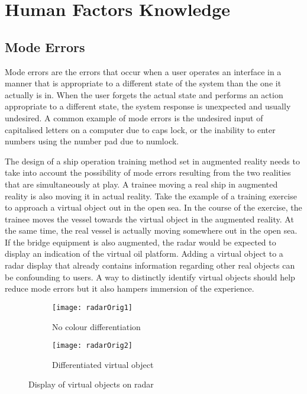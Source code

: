 \section{Human Factors Knowledge}
\label{sec:humanfactors}
\subsection{Mode Errors}
Mode errors are the errors that occur when a user operates an interface in a manner that is appropriate to a different state of the system than the one it actually is in. When the user forgets the actual state and performs an action appropriate to a different state, the system response is unexpected and usually undesired. A common example of mode errors is the undesired input of capitalised letters on a computer due to caps lock, or the inability to enter numbers using the number pad due to numlock. 

The design of a ship operation training method set in augmented reality needs to take into account the possibility of mode errors resulting from the two realities that are simultaneously at play. A trainee moving a real ship in augmented reality is also moving it in actual reality. Take the example of a training exercise to approach a virtual object out in the open sea. In the course of the exercise, the trainee moves the vessel towards the virtual object in the augmented reality. At the same time, the real vessel is actually moving somewhere out in the open sea. If the bridge equipment is also augmented, the radar would be expected to display an indication of the virtual oil platform. Adding a virtual object to a radar display that already contains information regarding other real objects can be confounding to users. A way to distinctly identify virtual objects should help reduce mode errors but it also hampers immersion of the experience. 

\begin{figure}[ht]
    \centering
    \begin{subfigure}[b]{0.45\textwidth}
        \centering
        \texttt{[image: radarOrig1]}
        \caption{No colour differentiation}
        \label{fig:three sin x}
    \end{subfigure}
    \hfill
    \begin{subfigure}[b]{0.45\textwidth}
        \centering
        \texttt{[image: radarOrig2]}
        \caption{Differentiated virtual object}
        \label{fig:five over x}
    \end{subfigure}
    \caption{Display of virtual objects on radar}
    \label{fig:three graphs}
\end{figure}


